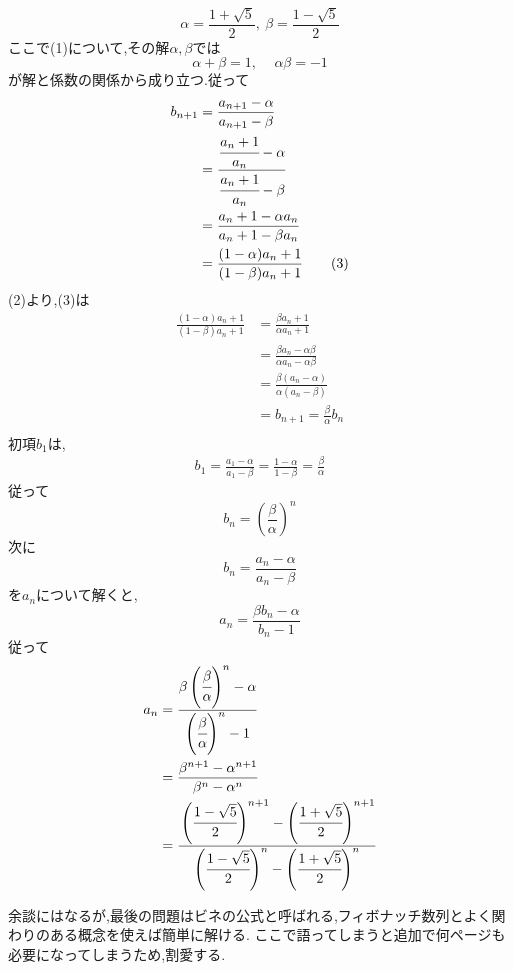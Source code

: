 \begin{enumerate}[label=(\arabic*),parsep=3pt]
        \[
          \alpha=\frac{1+\sqrt{5}}{2},\ \beta=\frac{1-\sqrt{5}}{2}
        \]
        ここで(1)について,その解$\alpha,\beta$では
        \[
          \alpha+\beta=1,\, \quad \alpha\beta=-1\tag{2}
        \]
        が解と係数の関係から成り立つ.従って
        \begin{align*}
          b_{n+1} & =\frac{a_{n+1}-\alpha}{a_{n+1}-\beta}                        \\
                  & =\cfrac{\cfrac{a_n+1}{a_n}-\alpha}{\cfrac{a_n+1}{a_n}-\beta} \\
                  & =\frac{a_n+1-\alpha a_n}{a_n+1-\beta a_n}                    \\
                  & =\frac{(1-\alpha)a_n+1}{(1-\beta)a_n+1}\tag{3}
        \end{align*}
        (2)より,(3)は
        \begin{align*}
          \frac{(1-\alpha)a_n+1}{(1-\beta)a_n+1} & =\frac{\beta a_n+1}{\alpha a_n+1}                     \\
                                                 & =\frac{\beta a_n-\alpha\beta}{\alpha a_n-\alpha\beta} \\
                                                 & =\frac{\beta (a_n-\alpha)}{\alpha (a_n-\beta)}        \\
                                                 & =b_{n+1}=\frac{\beta}{\alpha}b_n                      \\
        \end{align*}
        初項$b_1$は,
        \begin{align*}
          b_1=\frac{a_1-\alpha}{a_1-\beta}=\frac{1-\alpha}{1-\beta}=\frac{\beta}{\alpha}
        \end{align*}
        従って
        \[
          b_n=\left(\frac{\beta}{\alpha}\right)^n
        \]
        次に
        \[
          b_{n}=\frac{a_{n}-\alpha}{a_{n}-\beta}
        \]
        を$a_n$について解くと,
        \[
          a_{n}=\frac{\beta b_{n}-\alpha}{b_{n}-1}
        \]
        従って
        \begin{align*}
          a_{n} & =\cfrac{\beta \left(\cfrac{\beta}{\alpha}\right)^n-\alpha}{\left(\cfrac{\beta}{\alpha}\right)^n-1}                                                                    \\
                & =\frac{\beta^{n+1}-\alpha^{n+1}}{\beta^n-\alpha^n}                                                                                                                    \\
                & =\cfrac{\left(\cfrac{1-\sqrt{5}}{2}\right)^{n+1}-\left(\cfrac{1+\sqrt{5}}{2}\right)^{n+1}}{\left(\cfrac{1-\sqrt{5}}{2}\right)^n-\left(\cfrac{1+\sqrt{5}}{2}\right)^n}
        \end{align*}
\end{enumerate}
余談にはなるが,最後の問題はビネの公式と呼ばれる,フィボナッチ数列とよく関わりのある概念を使えば簡単に解ける.
ここで語ってしまうと追加で何ページも必要になってしまうため,割愛する.

